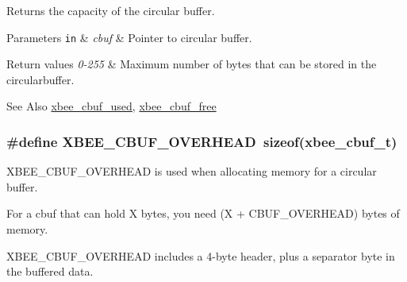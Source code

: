 Returns the capacity of the circular buffer. 


\begin{DoxyParams}[1]{Parameters}
\mbox{\tt in}  & {\em cbuf} & Pointer to circular buffer.\\
\hline
\end{DoxyParams}

\begin{DoxyRetVals}{Return values}
{\em 0-\/255} & Maximum number of bytes that can be stored in the circularbuffer.\\
\hline
\end{DoxyRetVals}
\begin{DoxySeeAlso}{See Also}
\hyperlink{group__util__cbuf_gaf3ac1a430fe9dbe3498e96c3b96bb0f7}{xbee\-\_\-cbuf\-\_\-used}, \hyperlink{group__util__cbuf_ga9a2eeedf642bdf31dba98aacdc5a7d75}{xbee\-\_\-cbuf\-\_\-free} 
\end{DoxySeeAlso}
\hypertarget{group__util__cbuf_ga6fb73f000c9aa3d2b26f3ae089676bfa}{
\subsubsection[{X\-B\-E\-E\-\_\-\-C\-B\-U\-F\-\_\-\-O\-V\-E\-R\-H\-E\-A\-D}]{\setlength{\rightskip}{0pt plus 5cm}\#define X\-B\-E\-E\-\_\-\-C\-B\-U\-F\-\_\-\-O\-V\-E\-R\-H\-E\-A\-D~sizeof({\bf xbee\-\_\-cbuf\-\_\-t})}}\label{group__util__cbuf_ga6fb73f000c9aa3d2b26f3ae089676bfa}


X\-B\-E\-E\-\_\-\-C\-B\-U\-F\-\_\-\-O\-V\-E\-R\-H\-E\-A\-D is used when allocating memory for a circular buffer. 

For a cbuf that can hold X bytes, you need (X + C\-B\-U\-F\-\_\-\-O\-V\-E\-R\-H\-E\-A\-D) bytes of memory.

X\-B\-E\-E\-\_\-\-C\-B\-U\-F\-\_\-\-O\-V\-E\-R\-H\-E\-A\-D includes a 4-\/byte header, plus a separator byte in the buffered data.

